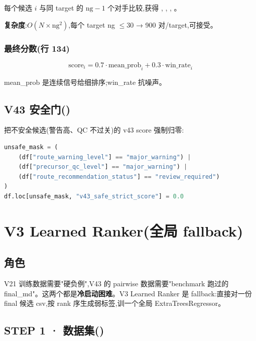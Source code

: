 每个候选 $i$ 与同 target 的 $\text{ng}-1$ 个对手比较,获得 , , , 。

\textbf{复杂度}:$O(N \times \text{ng}^2)$,每个 target ng $\le 30$ → 900 对/target,可接受。

\subsubsection{最终分数(行 134)}

\begin{equation}
\text{score}_i = 0.7 \cdot \text{mean\_prob}_i + 0.3 \cdot \text{win\_rate}_i
\end{equation}

mean\_prob 是连续信号给细排序;win\_rate 抗噪声。

\subsection{V43 安全门()}

把不安全候选(警告高、QC 不过关)的 v43 score 强制归零:

\begin{lstlisting}[language=Python]
unsafe_mask = (
    (df["route_warning_level"] == "major_warning") |
    (df["precursor_qc_level"] == "major_warning") |
    (df["route_recommendation_status"] == "review_required")
)
df.loc[unsafe_mask, "v43_safe_strict_score"] = 0.0
\end{lstlisting}

\section{V3 Learned Ranker(全局 fallback)}

\subsection{角色}

V21 训练数据需要"硬负例",V43 的 pairwise 数据需要"benchmark 跑过的 final\_md"。这两个都是\textbf{冷启动困难}。V3 Learned Ranker 是 fallback:直接对一份 final 候选 csv,按 rank 序生成弱标签,训一个全局 ExtraTreesRegressor。

\subsection{STEP 1 · 数据集()}

